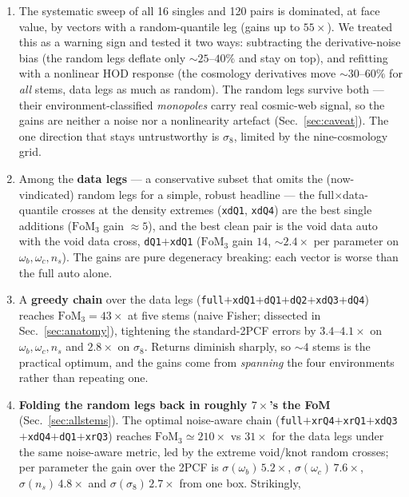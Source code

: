 \documentclass[11pt]{article}
\newcommand{\FoM}{\mathrm{FoM}}
\newcommand{\code}[1]{\texttt{#1}}
\begin{document}
\begin{enumerate}
\item The systematic sweep of all 16 singles and 120 pairs is dominated, at
  face value, by vectors with a random-quantile leg (gains up to $55\times$).
  We treated this as a warning sign and tested it two ways: subtracting the
  derivative-noise bias (the random legs deflate only $\sim\!25$--$40\%$ and stay
  on top), and refitting with a nonlinear HOD response (the cosmology derivatives
  move $\sim\!30$--$60\%$ for \emph{all} stems, data legs as much as random).
  The random legs survive both --- their environment-classified \emph{monopoles}
  carry real cosmic-web signal, so the gains are neither a noise nor a
  nonlinearity artefact (Sec.~\ref{sec:caveat}).  The one direction that stays
  untrustworthy is $\sigma_8$, limited by the nine-cosmology grid.
\item Among the \textbf{data legs} --- a conservative subset that omits the
  (now-vindicated) random legs for a simple, robust headline ---
  the full$\times$data-quantile
  crosses at the density extremes (\code{xdQ1}, \code{xdQ4}) are the best
  single additions ($\FoM_3$ gain $\approx 5$), and the best clean pair is
  the void data auto with the void data cross, \code{dQ1}$+$\code{xdQ1}
  ($\FoM_3$ gain $14$, $\sim\!2.4\times$ per parameter on
  $\omega_b,\omega_c,n_s$).  The gains are pure degeneracy breaking: each
  vector is worse than the full auto alone.
\item A \textbf{greedy chain} over the data legs
  (\code{full}$+$\code{xdQ1}$+$\code{dQ1}$+$\code{dQ2}$+$\code{xdQ3}$+$\code{dQ4})
  reaches $\FoM_3 = 43\times$ at five stems (naive Fisher; dissected in
  Sec.~\ref{sec:anatomy}), tightening the standard-2PCF errors by
  $3.4$--$4.1\times$ on $\omega_b,\omega_c,n_s$ and $2.8\times$ on $\sigma_8$.
  Returns diminish sharply,
  so $\sim\!4$ stems is the practical optimum, and the gains come from
  \emph{spanning} the four environments rather than repeating one.
\item \textbf{Folding the random legs back in roughly $7\times$'s the FoM}
  (Sec.~\ref{sec:allstems}).  The optimal noise-aware chain
  (\code{full}$+$\code{xrQ4}$+$\code{xrQ1}$+$\code{xdQ3}$+$\code{xdQ4}$+$\code{dQ1}$+$\code{xrQ3})
  reaches $\FoM_3 \simeq 210\times$ vs $31\times$ for the data legs under the same
  noise-aware metric, led by the extreme void/knot random crosses; per parameter
  the gain over the 2PCF is $\sigma(\omega_b)\,5.2\times$, $\sigma(\omega_c)\,7.6\times$,
  $\sigma(n_s)\,4.8\times$ and $\sigma(\sigma_8)\,2.7\times$ from one box.  Strikingly,

\end{enumerate}
\end{document}
